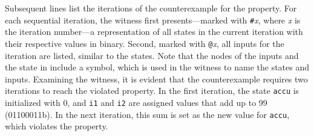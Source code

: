 Subsequent lines list the iterations of the counterexample for the
property. For each sequential iteration, the witness first
presents—marked with \texttt{\#}\textit{x}, where \textit{x} is the
iteration number—a representation of all states in the current
iteration with their respective values in binary. Second, marked with
\texttt{@}\textit{x}, all inputs for the iteration are listed,
similar to the states. Note that the nodes of the inputs and the
state in  include a symbol, which is used in
the witness to name the states and inputs. Examining the witness, it
is evident that the counterexample requires two iterations to reach
the violated property. In the first iteration, the state
\texttt{accu} is initialized with 0, and \texttt{i1} and \texttt{i2}
are assigned values that add up to 99 (01100011b). In the next
iteration, this sum is set as the new value for \texttt{accu}, which
violates the property.